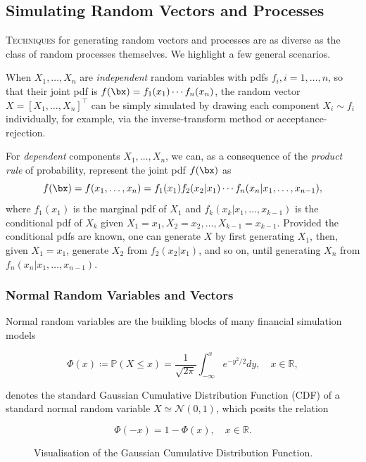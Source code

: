 \subsection{Simulating Random Vectors and Processes}
\lettrine[lines=2, lhang=0.1]{T}{echniques} for generating random vectors and processes are as diverse as the class of random processes themselves. We highlight a few general scenarios.

When $X_1, \dots, X_n$ are \textit{independent} random variables with pdfs $f_i, i = 1, \dots, n$, so that their joint pdf is $f(\bx) = f_1(x_1) \cdots f_n(x_n)$, the random vector $X = [X_1, \dots, X_n]^\top$ can be simply simulated by drawing each component $X_i \sim f_i$ individually, for example, via the inverse-transform method or acceptance-rejection.

For \textit{dependent} components $X_1, \dots, X_n$, we can, as a consequence of the \textit{product rule} of probability, represent the joint pdf $f(\bx)$ as
\begin{equation} \label{eq:JointPdfProductRule}
	f(\bx) = f(x_1, \dots, x_n) = f_1(x_1) f_2(x_2 | x_1) \cdots f_n(x_n | x_1, \dots, x_{n-1}),
\end{equation}
where $f_1(x_1)$ is the marginal pdf of $X_1$ and $f_k(x_k | x_1, \dots, x_{k-1})$ is the conditional pdf of $X_k$ given $X_1 = x_1, X_2 = x_2, \dots, X_{k-1} = x_{k-1}$. Provided the conditional pdfs are known, one can generate $X$ by first generating $X_1$, then, given $X_1 = x_1$, generate $X_2$ from $f_2(x_2 | x_1)$, and so on, until generating $X_n$ from $f_n(x_n | x_1, \dots, x_{n-1})$.

\subsubsection{Normal Random Variables and Vectors}
Normal random variables are the building blocks of many financial simulation models

$$ \Phi(x) \coloneqq \mathbb{P}(X \le x) = \frac{1}{\sqrt{2\pi}} \int_{-\infty}^{x} e^{-y^2 / 2} dy, \quad x \in \mathbb{R}, $$

denotes the standard Gaussian Cumulative Distribution Function (CDF) of a standard normal random variable $X \simeq \mathcal{N}(0,1)$, which posits the relation

\begin{equation}
	\Phi(-x) = 1 - \Phi(x), \quad x \in \mathbb{R}.
\end{equation}

\begin{figure}[H]
	\centering
	
	\caption{Visualisation of the Gaussian Cumulative Distribution Function.}
	\label{fig:GaussianCDF}
\end{figure}

